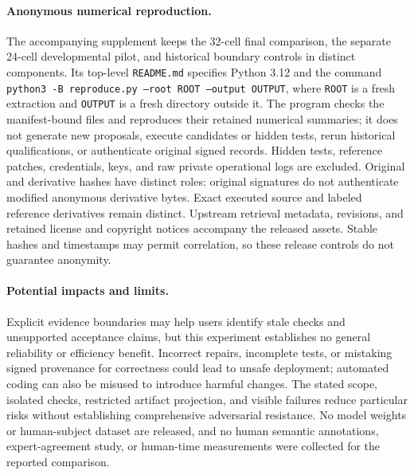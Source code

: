 \paragraph{Anonymous numerical reproduction.}
The accompanying supplement keeps the 32-cell final comparison, the separate
24-cell developmental pilot, and historical boundary controls in distinct
components. Its top-level \texttt{README.md} specifies Python 3.12 and the
command \texttt{python3 -B reproduce.py --root ROOT --output OUTPUT}, where
\texttt{ROOT} is a fresh extraction and \texttt{OUTPUT} is a fresh directory
outside it. The program checks the manifest-bound files and reproduces their
retained numerical summaries; it does not generate new proposals, execute
candidates or hidden tests, rerun historical qualifications, or authenticate
original signed records. Hidden tests, reference patches, credentials, keys,
and raw private operational logs are excluded. Original and derivative hashes
have distinct roles: original signatures do not authenticate modified anonymous
derivative bytes. Exact executed source and labeled reference derivatives remain
distinct. Upstream retrieval metadata, revisions, and retained license and
copyright notices accompany the released assets. Stable hashes and timestamps
may permit correlation, so these release controls do not guarantee anonymity.

\paragraph{Potential impacts and limits.}
Explicit evidence boundaries may help users identify stale checks and
unsupported acceptance claims, but this experiment establishes no general
reliability or efficiency benefit. Incorrect repairs, incomplete tests, or
mistaking signed provenance for correctness could lead to unsafe deployment;
automated coding can also be misused to introduce harmful changes. The stated
scope, isolated checks, restricted artifact projection, and visible failures
reduce particular risks without establishing comprehensive adversarial
resistance. No model weights or human-subject dataset are released, and no
human semantic annotations, expert-agreement study, or human-time measurements
were collected for the reported comparison. 